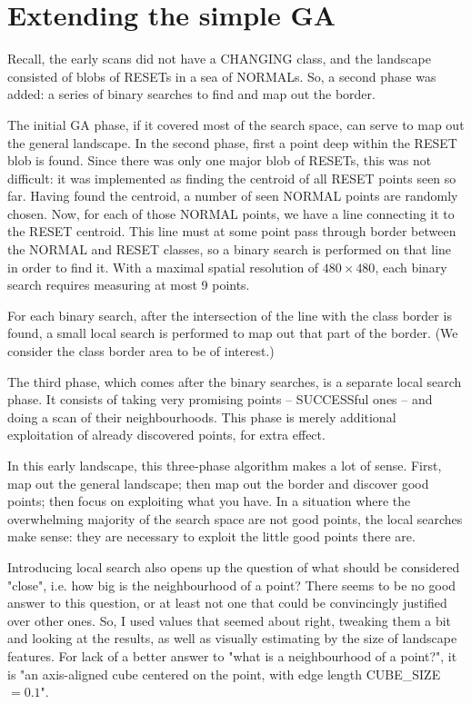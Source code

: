 \documentclass[times, utf8, diplomski]{fer}
\begin{document}
\section{Extending the simple GA}
Recall, the early scans did not have a CHANGING class, and the landscape consisted
of blobs of RESETs in a sea of NORMALs. So, a second phase was added: a series of
binary searches to find and map out the border.

The initial GA phase, if it covered most of the search space, can serve to map
out the general landscape. In the second phase, first a point deep within the
RESET blob is found. Since there was only one major blob of RESETs, this was not
difficult: it was implemented as finding the centroid of all RESET points seen
so far. Having found the centroid, a number of seen NORMAL points are randomly
chosen. Now, for each of those NORMAL points, we have a line connecting it to
the RESET centroid. This line must at some point pass through border between
the NORMAL and RESET classes, so a binary search is performed on that line in
order to find it. With a maximal spatial resolution of $480 \times 480$, each
binary search requires measuring at most 9 points.

For each binary search, after the intersection of the line with the class border
is found, a small local search is performed to map out that part of the border.
(We consider the class border area to be of interest.)

The third phase, which comes after the binary searches, is a separate local
search phase. It consists of taking very promising points -- SUCCESSful ones --
and doing a scan of their neighbourhoods. This phase is merely additional
exploitation of already discovered points, for extra effect.


In this early landscape, this three-phase algorithm makes a lot of sense.
First, map out the general landscape; then map out the border and discover
good points; then focus on exploiting what you have. In a situation where
the overwhelming majority of the search space are not good points, the
local searches make sense: they are necessary to exploit the little good
points there are.

Introducing local search also opens up the question of what should be considered
"close", i.e. how big is the neighbourhood of a point? There seems to be no good
answer to this question, or at least not one that could be convincingly justified
over other ones. So, I used values that seemed about right, tweaking them a bit
and looking at the results, as well as visually estimating by the size of
landscape features. For lack of a better answer to "what is a neighbourhood of
a point?", it is "an axis-aligned cube centered on the point, with edge length
CUBE\_SIZE $=0.1$".
\end{document}
